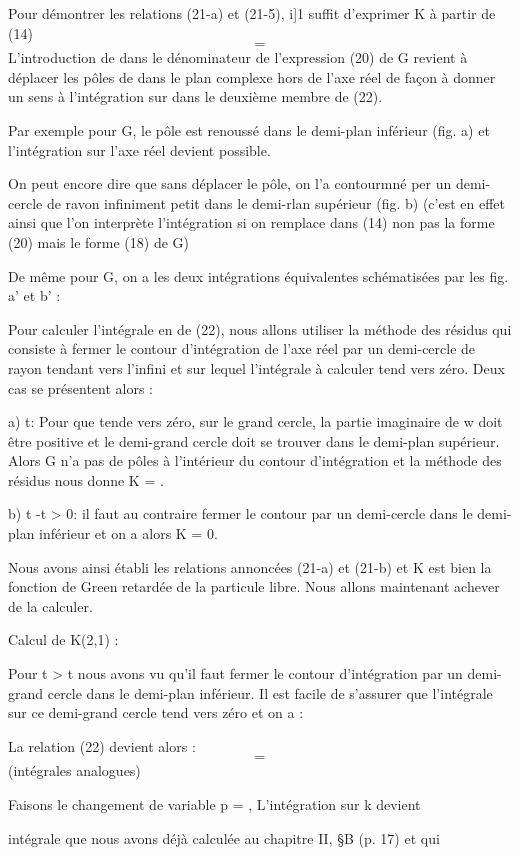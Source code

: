 Pour démontrer les relations (21-a) et (21-5), i]1 suffit
d'exprimer K à partir de (14)
\[
\tag{22}=
\]
L'introduction de  dans le dénominateur de l'expression (20) de G
revient à déplacer les pôles de  dans le plan complexe hors
de l'axe réel de façon à donner un sens à l'intégration sur  dans le
deuxième membre de (22).

Par exemple pour G, le pôle est renoussé dans le demi-plan
inférieur (fig. a) et l'intégration sur l'axe réel devient possible.

On peut encore dire que sans déplacer le pôle, on l'a contourmné per
un demi-cercle de ravon infiniment petit  dans le demi-rlan supérieur
(fig. b) (c'est en effet ainsi que l'on interprète l'intégration si on
remplace dans (14) non pas la forme (20) mais le forme (18) de G)

De même pour G, on a les deux intégrations équivalentes schématisées par les fig. a' et b' :

Pour calculer l'intégrale en  de (22), nous allons utiliser la méthode
des résidus qui consiste à fermer le contour d'intégration de l'axe réel
par un demi-cercle de rayon tendant vers l'infini et sur lequel l'intégrale
à calculer tend vers zéro. Deux cas se présentent alors :

a) t: Pour que  tende vers zéro, sur le grand
cercle, la partie imaginaire de w doit être positive et le demi-grand
cercle doit se trouver dans le demi-plan supérieur. Alors G n'a pas de
pôles à l'intérieur du contour d'intégration et la méthode des résidus
nous donne K = .

b) t -t > 0: il faut au contraire fermer le contour par un demi-cercle
dans le demi-plan inférieur et on a alors K = 0.

Nous avons ainsi établi les relations annoncées (21-a) et (21-b) et
K est bien la fonction de Green retardée de la particule libre. Nous
allons maintenant achever de la calculer.

Calcul de K(2,1) :

Pour t > t nous avons vu qu'il faut fermer le contour
d'intégration par un demi-grand cercle dans le demi-plan inférieur.
Il est facile de s'assurer que l'intégrale sur ce demi-grand cercle
tend vers zéro et on a :

La relation (22) devient alors :
\[
\tag{23}=
\]
(intégrales analogues)

Faisons le changement de variable p = , L'intégration sur k devient

intégrale que nous avons déjà calculée au chapitre II, \S B (p. 17) et qui

